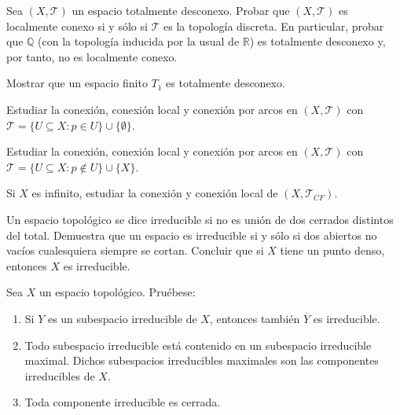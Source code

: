 \begin{ejer}[146]
Sea $(X, \mathcal{T})$ un espacio totalmente desconexo. Probar que $(X, \mathcal{T})$ es localmente conexo si y sólo si $\mathcal{T}$ es la topología discreta. En particular, probar que $\mathbb{Q}$ (con la topología inducida por la usual de $\mathbb{R}$) es totalmente desconexo y, por tanto, no es localmente conexo.
\end{ejer}

\begin{ejer}[147]
Mostrar que un espacio finito $T_1$ es totalmente desconexo.
\end{ejer}

\begin{ejer}[148]
Estudiar la conexión, conexión local y conexión por arcos en $(X, \mathcal{T})$ con $\mathcal{T} = \{U \subseteq X : p \in U\} \cup \{\emptyset\}$.
\end{ejer}

\begin{ejer}[149]
Estudiar la conexión, conexión local y conexión por arcos en $(X, \mathcal{T})$ con $\mathcal{T} = \{U \subseteq X : p \notin U\} \cup \{X\}$.
\end{ejer}

\begin{ejer}[150]
Si $X$ es infinito, estudiar la conexión y conexión local de $(X, \mathcal{T}_{CF})$.
\end{ejer}

\begin{ejer}[151]
Un espacio topológico se dice irreducible si no es unión de dos cerrados distintos del total. Demuestra que un espacio es irreducible si y sólo si dos abiertos no vacíos cualesquiera siempre se cortan. Concluir que si $X$ tiene un punto denso, entonces $X$ es irreducible.
\end{ejer}

\begin{ejer}[152]
Sea $X$ un espacio topológico. Pruébese:
\begin{enumerate}
    \item[a)] Si $Y$ es un subespacio irreducible de $X$, entonces también $\overline{Y}$ es irreducible.
    \item[b)] Todo subespacio irreducible está contenido en un subespacio irreducible maximal. Dichos subespacios irreducibles maximales son las componentes irreducibles de $X$.
    \item[c)] Toda componente irreducible es cerrada.
\end{enumerate}
\end{ejer}

